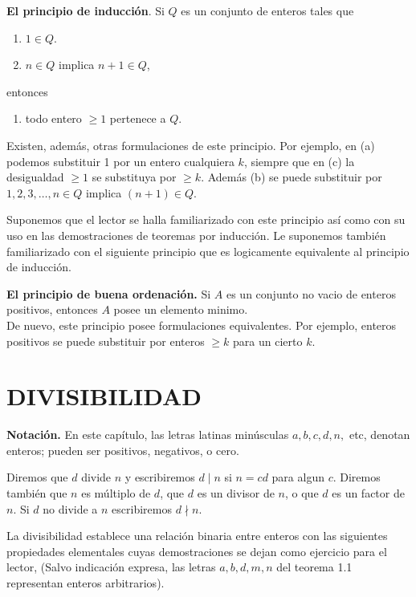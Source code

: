 \documentclass[12pt,a4paper]{book}
\begin{document}
    \textbf{El principio de inducción}. Si $Q$ es un conjunto de enteros tales que
    \begin{enumerate}
        \item[(a)] $1\in Q$.
        \item[(b)] $n\in Q$ implica $n+1\in Q$, 
    \end{enumerate}
    entonces
    \begin{enumerate}
        \item[(c)] todo entero $\geq1$ pertenece a $Q$.
    \end{enumerate}

    Existen, además, otras formulaciones de este principio. Por ejemplo, en (a) podemos
    substituir 1 por un entero cualquiera $k$, siempre que en (c) la desigualdad $\geq1$
    se substituya por $\geq k$. Además (b) se puede substituir por $1,2,3,\dots,n\in Q$
    implica $(n+1)\in Q$.

    Suponemos que el lector se halla familiarizado con este principio así como con su uso en las
    demostraciones de teoremas por inducción. Le suponemos también familiarizado con el siguiente
    principio que es logicamente equivalente al principio de inducción.

    \textbf{El principio de buena ordenación.} Si $A$ es un conjunto no vacio de enteros positivos,
    entonces $A$ posee un elemento minimo.\\
    De nuevo, este principio posee formulaciones equivalentes. Por ejemplo, enteros positivos
    se puede substituir por enteros $\geq k$ para un cierto $k$.

    \section{DIVISIBILIDAD}

    \textbf{Notación.} En este capítulo, las letras latinas minúsculas $a,b,c,d,n,$ etc,
    denotan enteros; pueden ser positivos, negativos, o cero.

    \begin{definicion}[Divisibilidad]
        Diremos que $d$ divide $n$ y escribiremos $d\mid n$ si $n=cd$ para algun $c$.
        Diremos también que $n$ es múltiplo de $d$, que $d$ es un divisor de $n$, o que
        $d$ es un factor de $n$. Si $d$ no divide a $n$ escribiremos $d\nmid n$.
    \end{definicion}

    La divisibilidad establece una relación binaria entre enteros con las siguientes propiedades
    elementales cuyas demostraciones se dejan como ejercicio para el lector, (Salvo indicación
    expresa, las letras $a,b,d,m,n$ del teorema 1.1 representan enteros arbitrarios).
\end{document}
